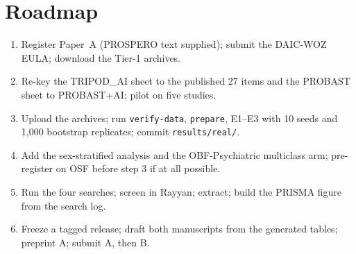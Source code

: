 \documentclass[11pt,a4paper]{article}
\begin{document}
\section{Roadmap}
\begin{enumerate}
\item Register Paper~A (PROSPERO text supplied); submit the DAIC-WOZ EULA; download the Tier-1 archives.
\item Re-key the TRIPOD\_AI sheet to the published 27 items and the PROBAST sheet to PROBAST+AI; pilot on five studies.
\item Upload the archives; run \texttt{verify-data}, \texttt{prepare}, E1--E3 with 10 seeds and 1{,}000 bootstrap replicates; commit \texttt{results/real/}.
\item Add the sex-stratified analysis and the OBF-Psychiatric multiclass arm; pre-register on OSF before step 3 if at all possible.
\item Run the four searches; screen in Rayyan; extract; build the PRISMA figure from the search log.
\item Freeze a tagged release; draft both manuscripts from the generated tables; preprint A; submit A, then B.
\end{enumerate}
\end{document}

